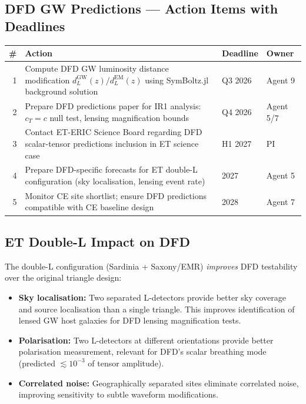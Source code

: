 \documentclass[11pt,a4paper]{article}
\begin{document}
\subsection{DFD GW Predictions --- Action Items with Deadlines}

\begin{center}
\begin{longtable}{rp{8cm}ll}
\toprule
\textbf{\#} & \textbf{Action} & \textbf{Deadline} & \textbf{Owner} \\
\midrule
\endfirsthead
1 & Compute DFD GW luminosity distance modification $d_L^\mathrm{GW}(z) / d_L^\mathrm{EM}(z)$ using SymBoltz.jl background solution & Q3 2026 & Agent 9 \\
2 & Prepare DFD predictions paper for IR1 analysis: $c_T = c$ null test, lensing magnification bounds & Q4 2026 & Agent 5/7 \\
3 & Contact ET-ERIC Science Board regarding DFD scalar-tensor predictions inclusion in ET science case & H1 2027 & PI \\
4 & Prepare DFD-specific forecasts for ET double-L configuration (sky localisation, lensing event rate) & 2027 & Agent 5 \\
5 & Monitor CE site shortlist; ensure DFD predictions compatible with CE baseline design & 2028 & Agent 7 \\
\bottomrule
\end{longtable}
\end{center}

\subsection{ET Double-L Impact on DFD}

The double-L configuration (Sardinia + Saxony/EMR) \emph{improves} DFD testability over the original triangle design:

\begin{itemize}
\item \textbf{Sky localisation:} Two separated L-detectors provide better sky coverage and source localisation than a single triangle. This improves identification of lensed GW host galaxies for DFD lensing magnification tests.
\item \textbf{Polarisation:} Two L-detectors at different orientations provide better polarisation measurement, relevant for DFD's scalar breathing mode (predicted $\lesssim 10^{-3}$ of tensor amplitude).
\item \textbf{Correlated noise:} Geographically separated sites eliminate correlated noise, improving sensitivity to subtle waveform modifications.
\end{itemize}
\end{document}
